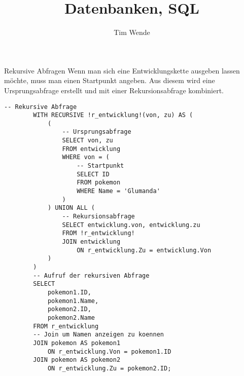 \documentclass[german]{spicker}
\title{Datenbanken, SQL}
\author{Tim Wende}
\begin{document}
\maketitle
\tableofcontents
\newpage














\begin{sql}{Rekursive Abfragen}
    Wenn man sich eine Entwicklungskette ausgeben lassen möchte, muss man einen Startpunkt angeben.
    Aus diesem wird eine Ursprungsabfrage erstellt und mit einer Rekursionsabfrage kombiniert.

    \begin{lstlisting}[language=mysql]
        -- Rekursive Abfrage
        WITH RECURSIVE !r_entwicklung!(von, zu) AS (
            (
                -- Ursprungsabfrage
                SELECT von, zu
                FROM entwicklung
                WHERE von = (
                    -- Startpunkt
                    SELECT ID
                    FROM pokemon
                    WHERE Name = 'Glumanda'
                )
            ) UNION ALL (
                -- Rekursionsabfrage
                SELECT entwicklung.von, entwicklung.zu
                FROM !r_entwicklung!
                JOIN entwicklung
                    ON r_entwicklung.Zu = entwicklung.Von
            )
        )
        -- Aufruf der rekursiven Abfrage
        SELECT
            pokemon1.ID,
            pokemon1.Name,
            pokemon2.ID,
            pokemon2.Name
        FROM r_entwicklung
        -- Join um Namen anzeigen zu koennen
        JOIN pokemon AS pokemon1
            ON r_entwicklung.Von = pokemon1.ID
        JOIN pokemon AS pokemon2
            ON r_entwicklung.Zu = pokemon2.ID;
    \end{lstlisting}
\end{sql}

\printindex
\printindex[Beispiele]

\printbibliography
\end{document}
